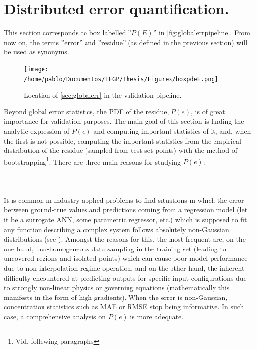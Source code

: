 \section{Distributed error quantification.}\label{sec:disterr}
\noindent This section corresponds to box labelled ''$P(E)$'' in \autoref{fig:globalerrpipeline}. From now on, the terms ''error'' and ''residue'' (as defined in the previous section) will be used as synonyms.\\
\begin{figure}[!htb]
	\centering
	\texttt{[image: /home/pablo/Documentos/TFGP/Thesis/Figures/boxpdeE.png]}
	\caption{Location of \autoref{sec:globalerr} in the validation pipeline.}
	\label{fig:globalerrpipeline}
\end{figure}
%
\indent Beyond global error statistics, the PDF of the residue, $P(e)$, is of great importance for validation purposes. The main goal of this section is finding the analytic expression of $P(e)$ and computing important statistics of it, and, when the first is not possible, computing the important statistics from the empirical distribution of the residue (sampled from test set points) with the method of bootstrapping\footnote{Vid. following paragraphs}. There are three main reasons for studying $P(e)$:\\
\paragraph{ \\}
It is common in industry-applied problems to find situations in which the error between ground-true values and predictions coming from a regression model (let it be a surrogate ANN, some parametric regressor, etc.) which is supposed to fit any function describing a complex system follows absolutely non-Gaussian distributions (see \eg \cite{chen2003non,pernot2020impact,smyl2021learning,chai2019using}). Amongst the reasons for this, the most frequent are, on the one hand, non-homogeneous data sampling in the training set (leading to uncovered regions and isolated points) which can cause poor model performance due to non-interpolation-regime operation, and on the other hand, the inherent difficulty encountered at predicting outputs for specific input configurations due to strongly non-linear physics or governing equations (mathematically this manifests in the form of high gradients). When the error is non-Gaussian, concentration statistics such as MAE or RMSE stop being informative. In such case, a comprehensive analysis on $P(e)$ is more adequate.\\
%
